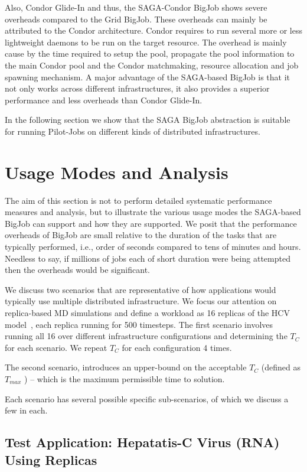 \documentclass[conference,final]{IEEEtran}
\newcommand{\numrep}{16 }
\newcommand{\samplenum}{4 }
\newcommand{\tmax}{$T_{max}$ }
\newcommand{\tc}{$T_{C}$ }
\begin{document}
Also, Condor Glide-In and thus, the SAGA-Condor BigJob shows severe 
overheads compared to the Grid BigJob. These overheads can mainly be 
attributed to the Condor architecture. Condor requires to run several more or less 
lightweight daemons to be run on the target resource. The overhead is mainly 
cause by the time required to setup the pool, propagate the pool information 
to the main Condor pool and the Condor matchmaking, resource allocation and 
job spawning mechanism. A major advantage of the SAGA-based BigJob is that
it not only works across different infrastructures, it also provides a superior
performance and less overheads than Condor Glide-In.

In the following section we show that the SAGA BigJob abstraction is
suitable for running Pilot-Jobs on different kinds of distributed
infrastructures.

\section{Usage Modes and Analysis}

The aim of this section is not to perform detailed systematic
performance measures and analysis, but to illustrate the various usage
modes the SAGA-based BigJob can support and how they are supported. We
posit that the performance overheads of BigJob are small relative to
the duration of the tasks that are typically performed, i.e., order of
seconds compared to tens of minutes and hours.  Needless to say, if
millions of jobs each of short duration were being attempted then the
overheads would be significant.

We discuss two scenarios that are representative of how applications
would typically use multiple distributed infrastructure. We focus our
attention on replica-based MD simulations and define a workload as
\numrep replicas of the HCV model~\cite{}, each replica running for
500 timesteps.  The first scenario involves running all \numrep over
different infrastructure configurations and determining the \tc for
each scenario. We repeat \tc for each configuration \samplenum times.

The second scenario, introduces an upper-bound on the acceptable \tc
(defined as \tmax) -- which is the maximum permissible time to
solution.

Each scenario has several possible specific sub-scenarios, of which we
discuss a few in each.

\subsection{Test Application: Hepatatis-C Virus (RNA) Using
  Replicas}
\end{document}
